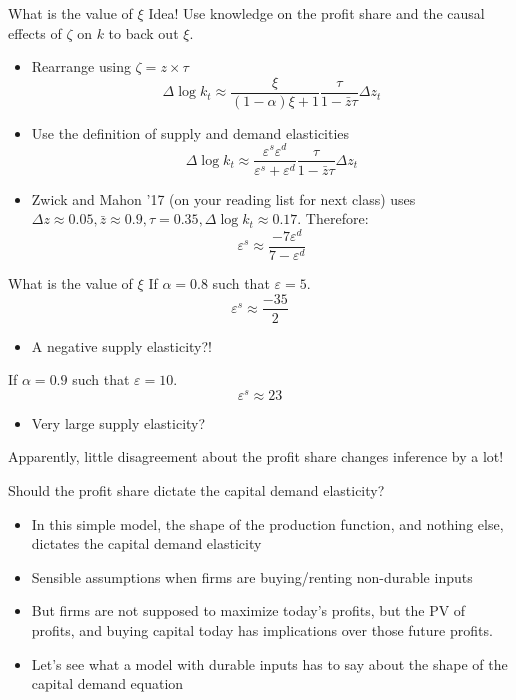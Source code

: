 \documentclass[11pt,aspectratio=169,xcolor={dvipsnames},hyperref={pdftex,pdfpagemode=UseNone,hidelinks,pdfdisplaydoctitle=true},usepdftitle=false]{beamer}
\begin{document}
\begin{frame}{What is the value of $\xi$}
Idea! Use knowledge on the profit share and the causal effects of $\zeta$ on $k$ to back out $\xi$.
\begin{itemize}
\item Rearrange using $\zeta = z \times \tau$
\[\Delta \log k_t \approx \frac{\xi}{(1-\alpha)\xi + 1} \frac{\tau}{1-\bar{z}\tau} \Delta z_t\]
\item Use the definition of supply and demand elasticities
\[\Delta \log k_t \approx \frac{\varepsilon^s \varepsilon^d}{\varepsilon^s + \varepsilon^d} \frac{\tau}{1-\bar{z}\tau} \Delta z_t\]
\item Zwick and Mahon '17 (on your reading list for next class) uses
$\Delta z \approx 0.05, \bar{z} \approx 0.9, \tau = 0.35, \Delta \log k_t \approx 0.17 $. Therefore:
\[\varepsilon^s \approx  \frac{-7 \varepsilon^d}{7 - \varepsilon^d}\]
\end{itemize}
\end{frame}

\begin{frame}{What is the value of $\xi$}
 If $\alpha = 0.8$ such that $\varepsilon = 5$.
\[\varepsilon^s \approx  \frac{-35}{2}\]
\begin{itemize}
\item A negative supply elasticity?!
\end{itemize}
 If $\alpha = 0.9$ such that $\varepsilon = 10$.
\[\varepsilon^s \approx 23\]
\begin{itemize}
\item Very large supply elasticity?
\end{itemize}
Apparently, little disagreement about the profit share changes inference by a lot!
\end{frame}

\begin{frame}{Should the profit share dictate the capital demand elasticity?}

\begin{itemize}
\item In this simple model, the shape of the production function, and nothing else, dictates the capital demand elasticity
\item Sensible assumptions when firms are buying/renting non-durable inputs
\item But firms are not supposed to maximize today's profits, but the PV of profits, and buying capital today has implications over those future profits.
\item Let's see what a model with durable inputs has to say about the shape of the capital demand equation
\end{itemize}

\end{frame}
\end{document}
